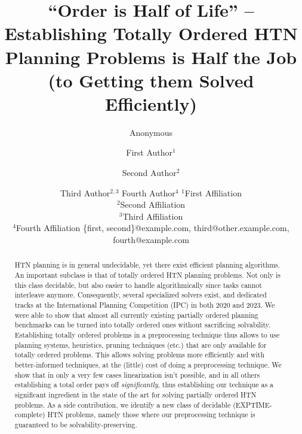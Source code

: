\documentclass{article}
\title{``Order is Half of Life'' -- Establishing Totally Ordered HTN Planning Problems is Half the Job (to Getting them Solved Efficiently)}
\author{Anonymous}
\author{
First Author$^1$
\and
Second Author$^2$\and
Third Author$^{2,3}$\And
Fourth Author$^4$
\affiliations
$^1$First Affiliation\\
$^2$Second Affiliation\\
$^3$Third Affiliation\\
$^4$Fourth Affiliation
\emails
\{first, second\}@example.com,
third@other.example.com,
fourth@example.com
}
\begin{document}
\maketitle

\begin{abstract}
HTN planning is in general undecidable, yet there exist efficient planning algorithms. An important subclass is that of totally ordered HTN planning problems. Not only is this class decidable, but also easier to handle algorithmically since tasks cannot interleave anymore. Consequently, several specialized solvers exist, and dedicated tracks at the International Planning Competition (IPC) in both 2020 and 2023. We were able to show that almost all currently existing partially ordered planning benchmarks can be turned into totally ordered ones without sacrificing solvability. Establishing totally ordered problems in a preprocessing technique thus allows to use planning systems, heuristics, pruning techniques (etc.) that are only available for totally ordered problems. This allows solving problems more efficiently and with better-informed techniques, at the (little) cost of doing a preprocessing technique. We show that in only a very few cases linearization isn't possible, and in all others establishing a total order pays off \emph{significantly}, thus establishing our technique as a significant ingredient in the state of the art for solving partially ordered HTN problems. As a side contribution, we identify a new class of decidable (EXPTIME-complete) HTN problems, namely those where our preprocessing technique is guaranteed to be solvability-preserving.
\end{abstract} 













\end{document}
